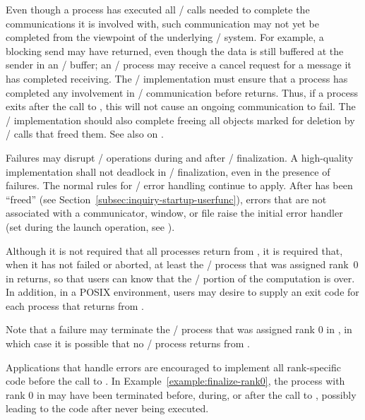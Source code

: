 \begin{implementors}
Even though a process has
  executed all \MPI/ calls needed to complete the communications
it is involved with, such
  communication may not yet be completed from the viewpoint of the underlying
  \MPI/ system.  For example, a blocking send may have returned, even though the data
  is still buffered
  at the sender in an \MPI/
    buffer; an \MPI/ process may receive a cancel request for a
  message it has completed receiving.  The \MPI/ implementation must ensure that a
  process has completed any involvement in \MPI/ communication before
   returns.  Thus, if a process exits after the call to
  , this will not cause an ongoing communication to
  fail.
The \MPI/ implementation should also complete freeing all
  objects marked for deletion by \MPI/ calls that freed them.
See also  on .
\end{implementors}

Failures may disrupt \MPI/ operations during and after \MPI/ finalization.
A high-quality implementation shall not deadlock in \MPI/ finalization, even in
the presence of failures. The normal
rules for \MPI/ error handling continue to apply.
After  has been ``freed'' (see Section~\ref{subsec:inquiry-startup-userfunc}), errors that are not associated
with a communicator, window, or file raise the initial error handler (set during the launch operation, see ).

Although it is not required that all processes return from
, it is required that, when it has not failed or aborted,
at least the \MPI/ process that was assigned rank~0 in
 returns, so
that users can know that the \MPI/ portion of the computation is over.  In
addition, in a POSIX environment, users may desire to supply an exit code for
each process that returns from .

Note that a failure may terminate the \MPI/ process that was assigned
rank 0 in , in which case it is possible
that no \MPI/ process returns from .

\par
\begin{users}
    Applications that handle errors are encouraged to implement all rank-specific
    code before the call to . In Example~\ref{example:finalize-rank0},
    the process with rank 0 in  may have been terminated before,
    during, or after the call to , possibly leading to the code
    after  never being executed.
\end{users}

